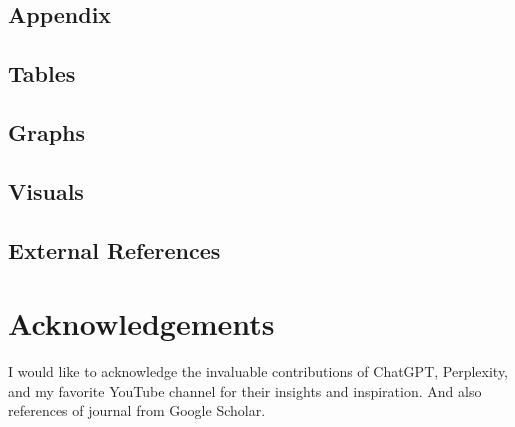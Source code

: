 \documentclass{article}
\begin{document}
\begin{appendices}
\section{Appendix}
\subsection{Tables}
\subsection{Graphs}
\subsection{Visuals}
\subsection{External References}
\end{appendices}

\section{Acknowledgements}
I would like to acknowledge the invaluable contributions of ChatGPT, Perplexity, and my favorite YouTube channel for their insights and inspiration. And also references of journal from Google Scholar.
\end{document}
